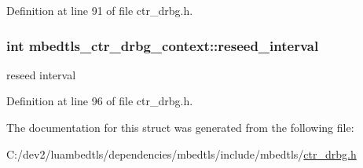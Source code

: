 Definition at line 91 of file ctr\-\_\-drbg.\-h.

\hypertarget{structmbedtls__ctr__drbg__context_a7b048c97f8dc916d89a0c7cd9d7f8522}{
\subsubsection[{reseed\-\_\-interval}]{\setlength{\rightskip}{0pt plus 5cm}int mbedtls\-\_\-ctr\-\_\-drbg\-\_\-context\-::reseed\-\_\-interval}}\label{structmbedtls__ctr__drbg__context_a7b048c97f8dc916d89a0c7cd9d7f8522}
reseed interval 

Definition at line 96 of file ctr\-\_\-drbg.\-h.



The documentation for this struct was generated from the following file\-:\begin{DoxyCompactItemize}
\item 
C\-:/dev2/luambedtls/dependencies/mbedtls/include/mbedtls/\hyperlink{ctr__drbg_8h}{ctr\-\_\-drbg.\-h}\end{DoxyCompactItemize}
